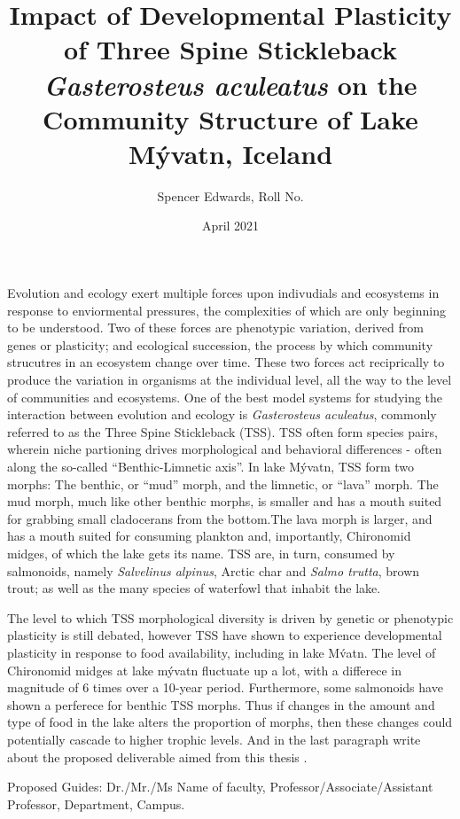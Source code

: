 \documentclass[12pt]{extarticle}
\title{Impact of Developmental Plasticity of Three Spine Stickleback \textit{Gasterosteus aculeatus} on the Community Structure of Lake M\'yvatn, Iceland}
\author{Spencer Edwards, Roll No.}
\date{April 2021}
\begin{document}
\maketitle

Evolution and ecology exert multiple forces upon indivudials and ecosystems in response to enviormental pressures, the complexities of which are only beginning to be understood. Two of these forces are phenotypic variation, derived from genes or plasticity; and ecological succession, the process by which community strucutres in an ecosystem change over time. These two forces act reciprically to produce the variation in organisms at the individual level, all the way to the level of communities and ecosystems. One of the best model systems for studying the interaction between evolution and ecology is \textit{Gasterosteus aculeatus}, commonly referred to as the Three Spine Stickleback (TSS). TSS often form species pairs, wherein niche partioning drives morphological and behavioral differences - often along the so-called ``Benthic-Limnetic axis''. In lake M\'yvatn, TSS form two morphs: The benthic, or ``mud'' morph, and the limnetic, or ``lava'' morph. The mud morph, much like other benthic morphs, is smaller and has a mouth suited for grabbing small cladocerans from the bottom.The lava morph is larger, and has a mouth suited for consuming plankton and, importantly, Chironomid midges, of which the lake gets its name. TSS are, in turn, consumed by salmonoids, namely \textit{Salvelinus alpinus}, Arctic char and \textit{Salmo trutta}, brown trout; as well as the many species of waterfowl that inhabit the lake.

The level to which TSS morphological diversity is driven by genetic or phenotypic plasticity is still debated, however TSS have shown to experience developmental plasticity in response to food availability, including in lake M\'vatn. The level of Chironomid midges at lake m\'yvatn fluctuate up a lot, with a differece in magnitude of 6 times over a 10-year period. Furthermore, some salmonoids have shown a perferece for benthic TSS morphs. Thus if changes in the amount and type of food in the lake alters the proportion of morphs, then these changes could potentially cascade to higher trophic levels.
And in the last paragraph write about the proposed deliverable aimed from this thesis  \cite{fractalwiki}.

Proposed Guides: Dr./Mr./Ms Name of faculty, Professor/Associate/Assistant Professor, Department, Campus.  \nocite{higham1998handbook}




\end{document}
